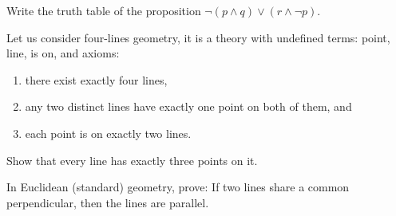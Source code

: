 \documentclass[addpoints]{exam}
\begin{document}
  \pagestyle{headandfoot}
  \runningheadrule

  \firstpagefooter{}{}{}
  \runningfooter{}{}{}
  \begin{flushright}

    \vspace{0.2in}
  \end{flushright}

  \begin{questions}
    \question[10]
      Write the truth table of the proposition
			$\lnot (p \land q) \lor (r \land \lnot p)$.

      \begin{solution}[\stretch{1}]
      \end{solution}
      \newpage
    \question[10]
      Let us consider four-lines geometry, it is a theory with undefined
			terms: point, line, is on, and axioms:
			\begin{enumerate}
			    \item there exist exactly four lines,
			    \item any two distinct lines have exactly one point on both of them, and
			    \item each point is on exactly two lines.
			\end{enumerate}
			
			Show that every line has exactly three points on it.

      \begin{solution}[\stretch{1}]
      \end{solution}
      \newpage
    \question[10]
      In Euclidean (standard) geometry, prove: If two lines share a common
			perpendicular, then the lines are parallel.

      \begin{solution}[\stretch{1}]
      \end{solution}
      \newpage
  \end{questions}
\end{document}
